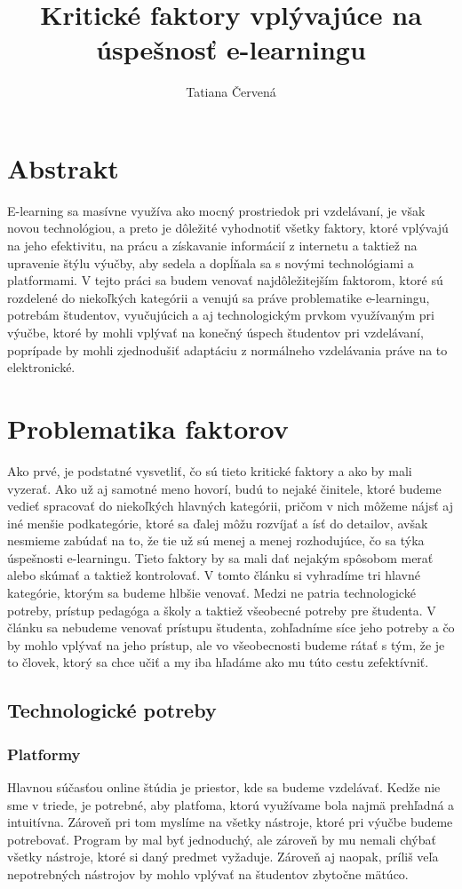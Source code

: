 \documentclass[12pt]{article}
\title{Kritické faktory vplývajúce na úspešnosť e-learningu}
\author{Tatiana Červená}
\begin{document}
\maketitle
\section*{Abstrakt}
E-learning sa masívne využíva ako mocný prostriedok pri vzdelávaní, je však novou technológiou, a preto je dôležité vyhodnotiť všetky faktory, ktoré vplývajú na jeho efektivitu, na prácu a získavanie informácií z internetu a taktiež na upravenie štýlu výučby, aby sedela a dopĺňala sa s novými technológiami a platformami. V tejto práci sa budem venovať najdôležitejším faktorom, ktoré sú rozdelené do niekoľkých kategórii a venujú sa práve problematike e-learningu, potrebám študentov, vyučujúcich a aj technologickým prvkom využívaným pri výučbe, ktoré by mohli vplývať na konečný úspech študentov pri vzdelávaní, poprípade by mohli zjednodušiť adaptáciu z normálneho vzdelávania práve na to elektronické.
\section{Problematika faktorov}
Ako prvé, je podstatné vysvetliť, čo sú tieto kritické faktory a ako by mali vyzerať. Ako už aj samotné meno hovorí, budú to nejaké činitele, ktoré budeme vedieť spracovať do niekoľkých hlavných kategórii, pričom v nich môžeme nájsť aj iné menšie podkategórie, ktoré sa ďalej môžu rozvíjať a ísť do detailov, avšak nesmieme zabúdať na to, že tie už sú menej a menej rozhodujúce, čo sa týka úspešnosti e-learningu. Tieto faktory by sa mali dať nejakým spôsobom merať alebo skúmať a taktiež kontrolovať. V tomto článku si vyhradíme tri hlavné kategórie, ktorým sa budeme hlbšie venovať. Medzi ne patria technologické potreby, prístup pedagóga a školy a taktiež všeobecné potreby pre študenta. V článku sa nebudeme venovať prístupu študenta, zohľadníme síce jeho potreby a čo by mohlo vplývať na jeho prístup, ale vo všeobecnosti budeme rátať s tým, že je to človek, ktorý sa chce učiť a my iba hľadáme ako mu túto cestu zefektívniť.   
\subsection{Technologické potreby}
\subsubsection{Platformy}
Hlavnou súčasťou online štúdia je priestor, kde sa budeme vzdelávať. Kedže nie sme v triede, je potrebné, aby platfoma, ktorú využívame bola najmä prehľadná a intuitívna. Zároveň pri tom myslíme na všetky nástroje, ktoré pri výučbe budeme potrebovať. Program by mal byť jednoduchý, ale zároveň by mu nemali chýbať všetky nástroje, ktoré si daný predmet vyžaduje. Zároveň aj naopak, príliš veľa nepotrebných nástrojov by mohlo vplývať na študentov zbytočne mätúco.  
\end{document}
